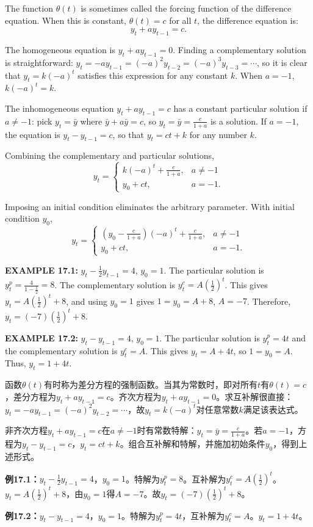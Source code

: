 \begin{original}
The function $\theta(t)$ is sometimes called the forcing function of the difference equation. When this is constant, $\theta(t) = c$ for all $t$, the difference equation is:
\[
y_t + a y_{t-1} = c.
\]

The homogeneous equation is $y_t + a y_{t-1} = 0$. Finding a complementary solution is straightforward: $y_t = -a y_{t-1} = (-a)^2 y_{t-2} = (-a)^3 y_{t-3} = \cdots$, so it is clear that $y_t = k(-a)^t$ satisfies this expression for any constant $k$. When $a = -1$, $k(-a)^t = k$.

The inhomogeneous equation $y_t + a y_{t-1} = c$ has a constant particular solution if $a \neq -1$: pick $y_t = \bar{y}$ where $\bar{y} + a\bar{y} = c$, so $y_t = \bar{y} = \frac{c}{1+a}$ is a solution. If $a = -1$, the equation is $y_t - y_{t-1} = c$, so that $y_t = ct + k$ for any number $k$.

Combining the complementary and particular solutions,
\[
y_t = \begin{cases}
k(-a)^t + \frac{c}{1+a}, & a \neq -1\\[4pt]
y_0 + ct, & a = -1.
\end{cases}
\]

Imposing an initial condition eliminates the arbitrary parameter. With initial condition $y_0$,
\[
y_t = \begin{cases}
\left(y_0 - \frac{c}{1+a}\right)(-a)^t + \frac{c}{1+a}, & a \neq -1\\[4pt]
y_0 + ct, & a = -1.
\end{cases}
\]

\textbf{EXAMPLE 17.1:} $y_t - \frac{1}{2} y_{t-1} = 4$, $y_0 = 1$. The particular solution is $y_t^p = \frac{4}{1-\frac{1}{2}} = 8$. The complementary solution is $y_t^c = A(\frac{1}{2})^t$. This gives $y_t = A(\frac{1}{2})^t + 8$, and using $y_0 = 1$ gives $1 = y_0 = A + 8$, $A = -7$. Therefore, $y_t = (-7)(\frac{1}{2})^t + 8$.

\textbf{EXAMPLE 17.2:} $y_t - y_{t-1} = 4$, $y_0 = 1$. The particular solution is $y_t^p = 4t$ and the complementary solution is $y_t^c = A$. This gives $y_t = A + 4t$, so $1 = y_0 = A$. Thus, $y_t = 1 + 4t$.
\end{original}
\begin{translation}
函数$\theta(t)$有时称为差分方程的强制函数。当其为常数时，即对所有$t$有$\theta(t) = c$，差分方程为$y_t + a y_{t-1} = c$。齐次方程为$y_t + a y_{t-1} = 0$。求互补解很直接：$y_t = -a y_{t-1} = (-a)^2 y_{t-2} = \cdots$，故$y_t = k(-a)^t$对任意常数$k$满足该表达式。

非齐次方程$y_t + a y_{t-1} = c$在$a \neq -1$时有常数特解：$y_t = \bar{y} = \frac{c}{1+a}$。若$a = -1$，方程为$y_t - y_{t-1} = c$，$y_t = ct + k$。组合互补解和特解，并施加初始条件$y_0$，得到上述形式。

\textbf{例17.1：}$y_t - \frac{1}{2} y_{t-1} = 4$，$y_0 = 1$。特解为$y_t^p = 8$。互补解为$y_t^c = A(\frac{1}{2})^t$。$y_t = A(\frac{1}{2})^t + 8$，由$y_0 = 1$得$A = -7$。故$y_t = (-7)(\frac{1}{2})^t + 8$。

\textbf{例17.2：}$y_t - y_{t-1} = 4$，$y_0 = 1$。特解为$y_t^p = 4t$，互补解为$y_t^c = A$。$y_t = 1 + 4t$。
\end{translation}


